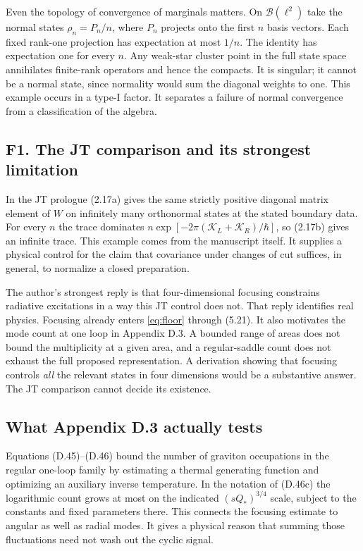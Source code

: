 \documentclass[11pt]{article}
\begin{document}
Even the topology of convergence of marginals matters. On $\mathcal B(\ell^2)$ take the normal states $\rho_n=P_n/n$, where $P_n$ projects onto the first $n$ basis vectors. Each fixed rank-one projection has expectation at most $1/n$. The identity has expectation one for every $n$. Any weak-star cluster point in the full state space annihilates finite-rank operators and hence the compacts. It is singular; it cannot be a normal state, since normality would sum the diagonal weights to one. This example occurs in a type-I factor. It separates a failure of normal convergence from a classification of the algebra.

\subsection{F1. The JT comparison and its strongest limitation}
In the JT prologue (2.17a) gives the same strictly positive diagonal matrix element of $W$ on infinitely many orthonormal states at the stated boundary data. For every $n$ the trace dominates $n\exp[-2\pi(\mathcal K_L+\mathcal K_R)/\hbar]$, so (2.17b) gives an infinite trace. This example comes from the manuscript itself. It supplies a physical control for the claim that covariance under changes of cut suffices, in general, to normalize a closed preparation.

The author's strongest reply is that four-dimensional focusing constrains radiative excitations in a way this JT control does not. That reply identifies real physics. Focusing already enters \eqref{eq:floor} through (5.21). It also motivates the mode count at one loop in Appendix D.3. A bounded range of areas does not bound the multiplicity at a given area, and a regular-saddle count does not exhaust the full proposed representation. A derivation showing that focusing controls \emph{all} the relevant states in four dimensions would be a substantive answer. The JT comparison cannot decide its existence.

\subsection{What Appendix D.3 actually tests}
Equations (D.45)--(D.46) bound the number of graviton occupations in the regular one-loop family by estimating a thermal generating function and optimizing an auxiliary inverse temperature. In the notation of (D.46c) the logarithmic count grows at most on the indicated $(sQ_*)^{3/4}$ scale, subject to the constants and fixed parameters there. This connects the focusing estimate to angular as well as radial modes. It gives a physical reason that summing those fluctuations need not wash out the cyclic signal.
\end{document}
